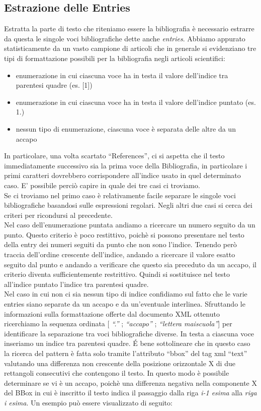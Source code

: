 \subsection{Estrazione delle Entries}
Estratta la parte di testo che riteniamo essere la bibliografia è necessario estrarre da questa le singole voci bibliografiche dette anche \textit{entries}. Abbiamo appurato statisticamente da un vasto campione di articoli che in generale si evidenziano tre tipi di formattazione possibili per la bibliografia negli articoli scientifici:
\begin{itemize}
 \item enumerazione in cui ciascuna voce ha in testa il valore dell'indice tra parentesi quadre (es. [1])
 \item enumerazione in cui ciascuna voce ha in testa il valore dell'indice puntato (es.  1.)
 \item nessun tipo di enumerazione, ciascuna voce è separata delle altre da un accapo
\end{itemize}
In particolare, una volta scartato ``References'', ci si aspetta che il testo immediatamente successivo sia la prima voce della Bibliografia, in particolare i primi caratteri dovrebbero corrispondere all'indice usato in quel determinato caso. E' possibile perciò capire in quale dei tre casi ci troviamo.
\\
Se ci troviamo nel primo caso è relativamente facile separare le singole voci bibliografiche basandosi sulle espressioni regolari. Negli altri due casi si cerca dei criteri per ricondursi al precedente.
\\
Nel caso dell'enumerazione puntata andiamo a ricercare un numero seguito da un punto. Questo criterio è poco restittivo, poichè si possono presentare nel testo della entry dei numeri seguiti da punto che non sono l'indice. Tenendo però traccia dell'ordine crescente dell'indice, andando a ricercare il valore esatto seguito dal punto e andando a verificare che questo sia preceduto da un accapo, il criterio diventa sufficientemente restrittivo. Quindi si sostituisce nel testo all'indice puntato l'indice tra parentesi quadre.
\\
Nel caso in cui non ci sia nessun tipo di indice confidiamo sul fatto che le varie entries siano separate da un accapo e da un'eventuale interlinea. Sfruttando le informazioni sulla formattazione offerte dal documento XML ottenuto ricerchiamo la sequenza ordinata [ \textit{``.''} ; \textit{``accapo''} ; \textit{``lettera maiscuola''}] per identificare la separazione tra voci bibliografiche diverse. In testa a ciascuna voce inseriamo un indice tra parentesi quadre. \'E bene sottolineare che in questo caso la ricerca del pattern è fatta solo tramite l'attributo ``bbox'' del tag xml ``text'' valutando una differenza non crescente della posizione orizzontale X di due rettangoli consecutivi che contengono il testo. In questo modo è possibile determinare se vi è un accapo, poichè una differenza negativa nella componente X del BBox in cui è inscritto il testo indica il passaggio dalla riga \textit{i-1 esima} alla \textit{riga i esima}. Un esempio può essere visualizzato di seguito:


